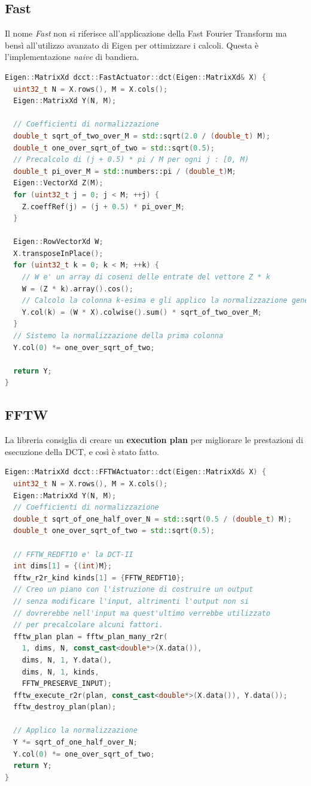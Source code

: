 \documentclass[a4paper,11pt,oneside, table]{article}
\begin{document}
\subsection{Fast}

Il nome \textit{Fast} non si riferisce all'applicazione della Fast Fourier Transform ma bens\`i all'utilizzo avanzato di Eigen per ottimizzare i calcoli.
Questa \`e l'implementazione \textit{naive} di bandiera.

\begin{lstlisting}[language=C++]
Eigen::MatrixXd dcct::FastActuator::dct(Eigen::MatrixXd& X) {
  uint32_t N = X.rows(), M = X.cols();
  Eigen::MatrixXd Y(N, M);

  // Coefficienti di normalizzazione
  double_t sqrt_of_two_over_M = std::sqrt(2.0 / (double_t) M);
  double_t one_over_sqrt_of_two = std::sqrt(0.5);
  // Precalcolo di (j + 0.5) * pi / M per ogni j : [0, M)
  double_t pi_over_M = std::numbers::pi / (double_t)M;
  Eigen::VectorXd Z(M);
  for (uint32_t j = 0; j < M; ++j) {
    Z.coeffRef(j) = (j + 0.5) * pi_over_M;
  }

  Eigen::RowVectorXd W;
  X.transposeInPlace();
  for (uint32_t k = 0; k < M; ++k) {
    // W e' un array di coseni delle entrate del vettore Z * k
    W = (Z * k).array().cos();
    // Calcolo la colonna k-esima e gli applico la normalizzazione generica
    Y.col(k) = (W * X).colwise().sum() * sqrt_of_two_over_M;
  }
  // Sistemo la normalizzazione della prima colonna
  Y.col(0) *= one_over_sqrt_of_two;

  return Y;
}
\end{lstlisting}

\subsection{FFTW}

La libreria consiglia di creare un \textbf{execution plan} per migliorare le prestazioni di esecuzione della DCT, e cos\`i \`e stato fatto.

\begin{lstlisting}[language=C++]
Eigen::MatrixXd dcct::FFTWActuator::dct(Eigen::MatrixXd& X) {
  uint32_t N = X.rows(), M = X.cols();
  Eigen::MatrixXd Y(N, M);
  // Coefficienti di normalizzazione
  double_t sqrt_of_one_half_over_N = std::sqrt(0.5 / (double_t) M);
  double_t one_over_sqrt_of_two = std::sqrt(0.5);

  // FFTW_REDFT10 e' la DCT-II
  int dims[1] = {(int)M}; 
  fftw_r2r_kind kinds[1] = {FFTW_REDFT10};
  // Creo un piano con l'istruzione di costruire un output
  // senza modificare l'input, altrimenti l'output non si
  // dovrerebbe nell'input ma quest'ultimo verrebbe utilizzato
  // per precalcolare alcuni fattori.
  fftw_plan plan = fftw_plan_many_r2r(
    1, dims, N, const_cast<double*>(X.data()),
    dims, N, 1, Y.data(),
    dims, N, 1, kinds,
    FFTW_PRESERVE_INPUT);
  fftw_execute_r2r(plan, const_cast<double*>(X.data()), Y.data());
  fftw_destroy_plan(plan);

  // Applico la normalizzazione
  Y *= sqrt_of_one_half_over_N;
  Y.col(0) *= one_over_sqrt_of_two;
  return Y;
}
\end{lstlisting}
\end{document}
